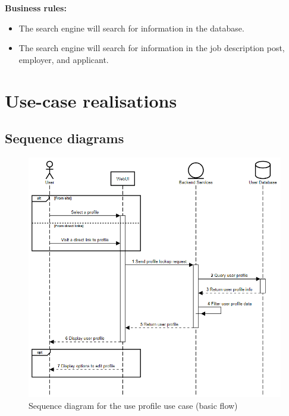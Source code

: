 \documentclass[a4paper]{article}
\begin{document}
        \textbf{Business rules:}
        \begin{itemize}
            \item The search engine will search for information in the database.
            \item The search engine will search for information in the job description post, employer, and applicant.
        \end{itemize}
\section{Use-case realisations}
    \subsection{Sequence diagrams}

    \begin{figure}[ht]
        \centering
        \includegraphics[width=1.0\textwidth]{view_profile.png}
        \caption{Sequence diagram for the use profile use case (basic flow)}
        \label{fig:fig2}
    \end{figure}
\end{document}
